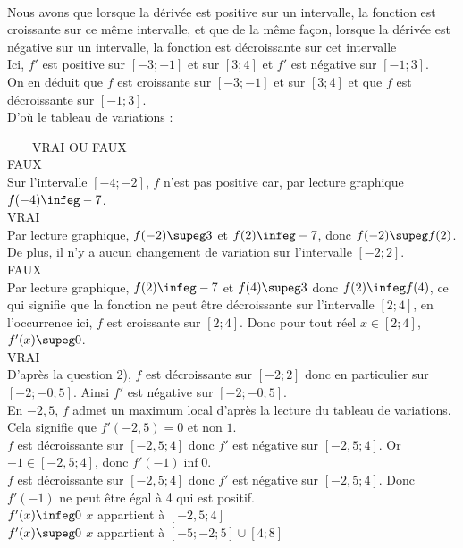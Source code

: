\clearpage
\begin{questions}
\setcounter{exercice}{30}

\exercice\\
Nous avons que lorsque la dérivée est positive sur un intervalle, la fonction est croissante sur ce même intervalle, et que de la même façon, lorsque la dérivée est négative sur un intervalle, la fonction est décroissante sur cet intervalle\\

Ici, $f'$ est positive sur $[-3;-1]$ et sur $[3;4]$ et $f'$ est négative sur $[-1;3]$.\\
On en déduit que $f$ est croissante sur $[-3;-1]$ et sur $[3;4]$ et que $f$ est décroissante sur $[-1;3]$.\\

D'où le tableau de variations :



\exercice ~~~~VRAI OU FAUX\\
\question FAUX\\
Sur l'intervalle $[-4;-2]$, $f$ n'est pas positive car, par lecture graphique $f(-4) \infeg -7 $.\\
\question VRAI\\
Par lecture graphique, $f(-2) \supeg 3 $ et $f(2) \infeg -7$, donc $f(-2) \supeg f(2)$. De plus, il n'y a aucun changement de variation sur l'intervalle $[-2;2]$.\\
\question FAUX\\
Par lecture graphique, $f(2) \infeg -7$ et $f(4) \supeg 3$ donc $f(2) \infeg f(4)$, ce qui signifie que la fonction ne peut être décroissante sur l'intervalle $[2;4]$, en l'occurrence ici, $f$ est croissante sur $[2;4]$. Donc pour tout réel $x\in[2;4]$, $f'(x) \supeg 0$.\\
\question VRAI\\
D'après la question 2), $f$ est décroissante sur $[-2;2]$ donc en particulier sur $[-2;-0;5]$. Ainsi $f'$ est négative sur $[-2;-0;5]$.\\

\exercice 
\question 
\subpart En $-2,5$, $f$ admet un maximum local d'après la lecture du tableau de variations. Cela signifie que $f'(-2,5) = 0$ et non $1$.\\
\subpart $f$ est décroissante sur $[-2,5;4]$ donc $f'$ est négative sur $[-2,5;4]$. Or $-1\in[-2,5;4]$, donc $f'(-1) \inf 0$.\\
\subpart $f$ est décroissante sur $[-2,5;4]$ donc $f'$ est négative sur $[-2,5;4]$. Donc $f'(-1)$ ne peut être égal à 4 qui est positif.\\
\question 
\subpart $f'(x) \infeg 0$ \ssi $x$ appartient à $[-2,5;4]$\\
\subpart $f'(x) \supeg 0$ \ssi $x$ appartient à $[-5;-2;5] \cup [4;8]$\\


\end{questions}
